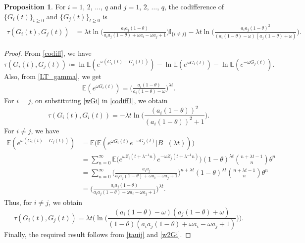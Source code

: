 \documentclass[12pt,oneside,reqno]{amsart}
\numberwithin{equation}{section}
\theoremstyle{definition}
\numberwithin{equation}{section}
\newtheorem{proposition}{Proposition}[section]
\theoremstyle{remarkstyle}
\begin{document}
\begin{proposition}
For $i=1$, $2$, $\dots$, $q$ and $j=1$, $2$, $\dots$, $q$, the codifference of $\{G_i(t)\}_{t\ge 0}$ and $\{G_j(t)\}_{t\ge 0}$ is 
{\footnotesize\begin{align*}
\tau(G_i(t),G_j(t))&=\lambda t \ln\Big(\frac{a_ia_j(1-\theta)}{a_ia_j(1-\theta)+\omega a_i-\omega a_j+1}\Big)\mathbb{I}_{\{i\ne j\}} -\lambda t\ln\Big(\frac{a_ia_j(1-\theta)^2}{(a_i(1-\theta)-\omega)(a_j(1-\theta)+\omega)}\Big).
\end{align*}}
\end{proposition}
\begin{proof}
From \eqref{codiff}, we have
\begin{equation}\label{codiff1}
\tau(G_i(t),G_j(t))\coloneq\ln\mathbb{E}(e^{\omega(G_i(t)-G_j(t))})-\ln\mathbb{E}(e^{\omega G_i(t)})-\ln\mathbb{E}(e^{-\omega G_j(t)}).
\end{equation}
Also, from \eqref{LT_gamma}, we get
\begin{align}\label{wGi}
\mathbb{E}(e^{\omega G_i(t)})=\Big(\frac{a_i(1-\theta)}{a_i(1-\theta)-\omega}\Big)^{\lambda t}.
\end{align}
For $i=j$, on substituting \eqref{wGi} in \eqref{codiff1}, we obtain
\begin{equation}\label{tauij}
\tau(G_i(t),G_i(t))= -\lambda t\ln\Big(\frac{(a_i(1-\theta))^2}{(a_i(1-\theta))^2+1}\Big).
\end{equation}
For $i\ne j$, we have 
\begin{align*}
\mathbb{E}(e^{\omega(G_i(t)-G_j(t))})
&=\mathbb{E}\big(\mathbb{E}(e^{\omega G_i(t)}e^{-\omega G_j(t)}|B^-(\lambda t))\big)\nonumber\\
&=\sum_{n=0}^{\infty}\mathbb{E}\big(e^{\omega Z_i(t+\lambda^{-1} n)}e^{-\omega Z_j(t+\lambda^{-1} n)}\big)(1-\theta)^{\lambda t}{n+\lambda t-1\choose n}\theta^n\nonumber\\
&=\sum_{n=0}^{\infty}\Big(\frac{a_ia_j}{a_ia_j(1-\theta)+\omega a_i-\omega a_j+1}\Big)^{n+\lambda t}(1-\theta)^{\lambda t}{n+\lambda t-1\choose n}\theta^n\nonumber\\
&=\Big(\frac{a_ia_j(1-\theta)}{a_ia_j(1-\theta)+\omega a_i-\omega a_j+1}\Big)^{\lambda t}.
\end{align*}
Thus, for $i\ne j$, we obtain
{\footnotesize\begin{equation}\label{w2Gi}
\tau(G_i(t),G_j(t))=\lambda t \Big(\ln\Big(\frac{(a_i(1-\theta)-\omega)(a_j(1-\theta)+\omega)}{(1-\theta)(a_ia_j(1-\theta)+\omega a_i-\omega a_j+1)}\Big) \Big).
\end{equation}}
Finally, the required result follows from \eqref{tauij} and \eqref{w2Gi}.
\end{proof}
\end{document}
